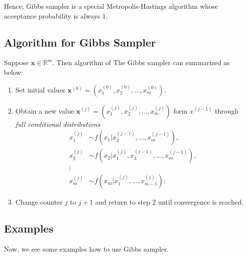 Hence, Gibbs sampler is a special Metropolis-Hastings algorithm whose acceptance probability is always 1.

\subsection{Algorithm for Gibbs Sampler}
Suppose $ \mathbf{x}\in \mathds{R}^m $. Then algorithm of The Gibbs sampler can summarized as below:
\begin{enumerate}
    \item Set initial values $ \mathbf{x}^{(0)} = ( x_1^{(0)}, x_2^{(0)} , \ldots , x_m^{(0)}  ) $.
    \item Obtain a new value $ \mathbf{x}^{(j)} = ( x_1^{(j)}, x_2^{(j)}, \ldots , x_m^{(j)} )$ form $ x^{(j-1)} $ through \textit{full conditional distributions}
            \begin{align*}
                x_1^{(j)} &\sim f(x_1|x_2^{(j-1)}, \ldots, x_m^{(j-1)}  ),\\
                x_2^{(j)} &\sim f(x_2|x_1^{(j)}, x_3^{(j-1)}, \ldots, x_m^{(j-1)}), \\
                \vdots \\
                x_m^{(j)} &\sim f(x_m|x_1^{(j)}, \ldots , x_{m-1}^{(j)}  );
            \end{align*}
            \item Change counter $ j $ to $ j + 1 $ and return to step 2 until convergence is reached. 
\end{enumerate}

\subsection{Examples}
Now, we see some examples how to use Gibbs sampler.

